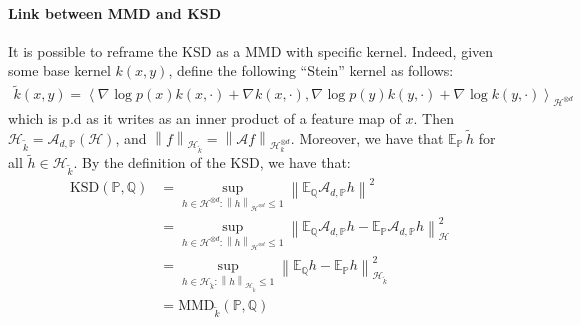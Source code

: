 \documentclass{uai2023} %
\begin{document}
\paragraph{Link between MMD and KSD} 
It is possible \cite{gorham2017measuring} to reframe the KSD as a MMD with specific kernel. Indeed, given some base kernel $ k(x, y) $, define the following ``Stein'' kernel as follows:
\begin{equation*} \label{eq:stein-kernel}
\begin{aligned}
    \tilde{ k }(x, y) = \left \langle \nabla_{  }  \log p(x)k(x, \cdot) + \nabla_{  }  k(x, \cdot), \nabla_{  }  \log p(y)k(y, \cdot) + \nabla_{  }  \log k(y, \cdot)     \right \rangle_{\mathcal  H^{\otimes d}}
\end{aligned}
\end{equation*}
which is p.d as it writes as an inner product of a feature map of $ x $. Then $
\mathcal  H_{ \tilde{ k}} = \mathcal A_{d, \mathbb{ P }}( \mathcal  H) $, and $ \left \| f \right \|_{ \mathcal  H_{\tilde{k}}} = \left \| \mathcal  A f \right \|_{\mathcal  H_{k}^{\otimes d}} $.
Moreover, we have that $ \mathbb{E}_{ \mathbb{ P } } \, \tilde{ h} $ for all $
\tilde{h} \in \mathcal  H_{ \tilde{k}} $. By the definition of the KSD, we have that:
\begin{equation*} 
\begin{aligned}
\text{KSD}(\mathbb{ P }, \mathbb{ Q }) &= \sup_{ h   \in \mathcal  H^{\otimes d}: \left \|h \right \|_{\mathcal H^{\otimes d}} \leq 1 } \left \| \mathbb{E}_{ \mathbb{ Q } } \mathcal  A_{d, \mathbb{ P }} h  \right \|^2\\
				       &= \sup_{ h \in \mathcal  H^{\otimes d}: \left \|h \right \|_{\mathcal H^{\otimes d}} \leq 1 } \left \| \mathbb{E}_{ \mathbb{ Q } } \mathcal  A_{d, \mathbb{ P }} h  - \mathbb{E}_{  \mathbb{ P } } \mathcal  A_{d, \mathbb{ P }} h\right \|^2_{\mathcal  H} \\
				       &= \sup_{ h \in \mathcal  H_{\tilde{k}}: \left \|h \right \|_{\mathcal  H_{\tilde{k}}} \leq 1 } \left \| \mathbb{E}_{ \mathbb{ Q } }   h  - \mathbb{E}_{  \mathbb{ P } } h\right \|^2_{\mathcal  H_{\tilde{k}}} \\
				       &= \text{MMD}_{\tilde{ k}}(\mathbb{ P }, \mathbb{ Q })
\end{aligned}
\end{equation*}
\end{document}
